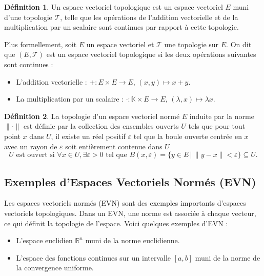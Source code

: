 \documentclass{article}
\theoremstyle{definition}
\newtheorem{definition}{Définition}[section]
\theoremstyle{plain}
\begin{document}
\begin{definition}
    Un espace vectoriel topologique est un espace vectoriel $E$ muni d'une topologie $\mathcal{T}$, telle que les opérations de l'addition vectorielle et de la multiplication par un scalaire sont continues par rapport à cette topologie.
    
    Plus formellement, soit $E$ un espace vectoriel et $\mathcal{T}$ une topologie sur $E$. On dit que $(E, \mathcal{T})$ est un espace vectoriel topologique si les deux opérations suivantes sont continues :
    
    \begin{itemize}
        \item L'addition vectorielle : $+: E \times E \rightarrow E$, $(x, y) \mapsto x + y$.
        \item La multiplication par un scalaire : $\cdot: \mathbb{K} \times E \rightarrow E$, $(\lambda, x) \mapsto \lambda x$.
    \end{itemize}    
\end{definition}

\begin{definition}
La topologie d'un espace vectoriel normé \( E \) induite par la norme \( \|\cdot\| \) est définie par la collection des ensembles ouverts \( U \) tels que pour tout point \( x \) dans \( U \), il existe un réel positif \( \varepsilon \) tel que la boule ouverte centrée en \( x \) avec un rayon de \( \varepsilon \) soit entièrement contenue dans \( U \)
\[ U \text{ est ouvert si } \forall x \in U, \exists \varepsilon > 0 \text{ tel que } B(x, \varepsilon) = \{y \in E \,|\, \|y - x\| < \varepsilon\} \subseteq U. \]

\end{definition}

\subsection{Exemples d'Espaces Vectoriels Normés (EVN)}
Les espaces vectoriels normés (EVN) sont des exemples importants d'espaces vectoriels topologiques. Dans un EVN, une norme est associée à chaque vecteur, ce qui définit la topologie de l'espace. Voici quelques exemples d'EVN :

\begin{itemize}
    \item L'espace euclidien $\mathbb{R}^n$ muni de la norme euclidienne.
    \item L'espace des fonctions continues sur un intervalle $[a, b]$ muni de la norme de la convergence uniforme.
\end{itemize}
\end{document}
